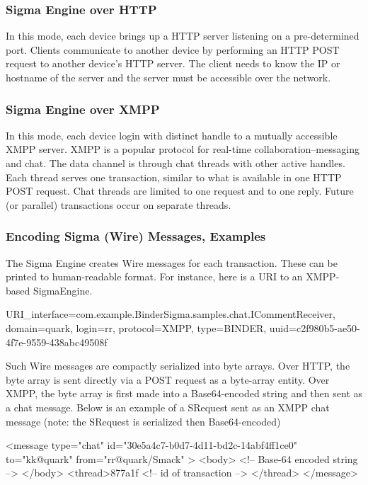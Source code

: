 \documentclass[prodmode]{acmlarge}
\begin{document}
\subsubsection{Sigma Engine over HTTP}
In this mode, each device brings up a HTTP server listening on a pre-determined port. Clients communicate to another device by performing an HTTP POST request to another device's HTTP server. The client needs to know the IP or hostname of the server and the server must be accessible over the network.

\subsubsection{Sigma Engine over XMPP}
In this mode, each device login with distinct handle to a mutually accessible XMPP server. XMPP is a popular protocol for real-time collaboration--messaging and chat. The data channel is through chat threads with other active handles. Each thread serves one transaction, similar to what is available in one HTTP POST request. Chat threads are limited to one request and to one reply. Future (or parallel) transactions occur on separate threads.

\subsubsection{Encoding Sigma (Wire) Messages, Examples}
The Sigma Engine creates Wire messages for each transaction. These can be printed to human-readable format. For instance, here is a URI to an XMPP-based SigmaEngine.

\begin{snippet}
URI{_interface=com.example.BinderSigma.samples.chat.ICommentReceiver,
domain=quark, login=rr, protocol=XMPP, type=BINDER,
uuid=c2f980b5-ae50-4f7e-9559-438abc49508f}
\end{snippet}

Such Wire messages are compactly serialized into byte arrays. Over HTTP, the byte array is sent directly via a POST request as a byte-array entity. Over XMPP, the byte array is first made into a Base64-encoded string and then sent as a chat message. Below is an example of a SRequest sent as an XMPP chat message (note: the SRequest is serialized then Base64-encoded)

\begin{snippet}
<message type="chat" id="30e5a4c7-b0d7-4d11-bd2c-14abf4ff1ce0"
        to="kk@quark" from="rr@quark/Smack" >
        <body> <!-- Base-64 encoded string --> </body>
        <thread>877a1f <!-- id of transaction --> </thread>
        </message>
\end{snippet}
\end{document}
